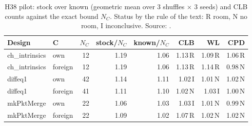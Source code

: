 \begin{table}[t]
\caption{H38 pilot: stock over known (geometric mean over 3 shuffles $\times$ 3 seeds) and CLB counts against the exact bound $N_C$. Status by the rule of the text: R room, N no room, I inconclusive. Source: .}
\label{tab:r9pilot}
\centering
\scriptsize\setlength{\tabcolsep}{2pt}
\begin{tabular}{@{}llrrrrrr@{}}
\toprule
Design & C & $N_C$ & stock/$N_C$ & known/$N_C$ & CLB & WL & CPD \\
\midrule
ch\_intrinsics & own & 12 & 1.19 & 1.06 & 1.13\,R & 1.09\,R & 1.06\,R \\
ch\_intrinsics & foreign & 12 & 1.19 & 1.06 & 1.13\,R & 1.14\,R & 0.98\,N \\
diffeq1 & own & 42 & 1.14 & 1.11 & 1.02\,I & 1.01\,N & 1.02\,N \\
diffeq1 & foreign & 41 & 1.11 & 1.10 & 1.02\,N & 1.03\,I & 1.00\,N \\
mkPktMerge & own & 22 & 1.06 & 1.03 & 1.03\,I & 1.01\,N & 0.99\,N \\
mkPktMerge & foreign & 22 & 1.09 & 1.02 & 1.07\,R & 1.02\,N & 1.02\,N \\
\bottomrule
\end{tabular}
\end{table}

